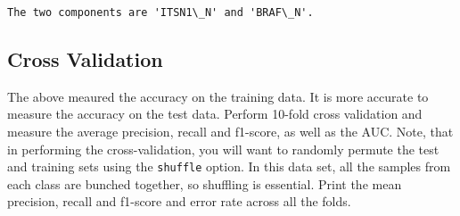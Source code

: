 \documentclass[11pt]{article}
\begin{document}
    \begin{Verbatim}[commandchars=\\\{\}]
The two components are 'ITSN1\_N' and 'BRAF\_N'.

    \end{Verbatim}

    \hypertarget{cross-validation}{%
\subsection{Cross Validation}\label{cross-validation}}

The above meaured the accuracy on the training data. It is more accurate
to measure the accuracy on the test data. Perform 10-fold cross
validation and measure the average precision, recall and f1-score, as
well as the AUC. Note, that in performing the cross-validation, you will
want to randomly permute the test and training sets using the
\texttt{shuffle} option. In this data set, all the samples from each
class are bunched together, so shuffling is essential. Print the mean
precision, recall and f1-score and error rate across all the folds.
\end{document}

